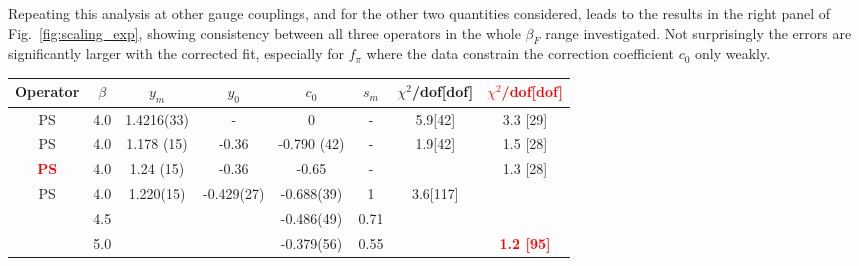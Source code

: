 \documentclass[aps,prl,twocolumn,]{revtex4}  %
\newcommand{\fig}[1]{Fig.~\ref{#1}}
\newcommand{\TODO}[1]{\textcolor{red}{{\bf #1}}}
\begin{document}
Repeating this analysis at other gauge couplings, and for the other two quantities considered, leads to the results in the right panel of \fig{fig:scaling_exp}, showing consistency between all three operators in the whole $\beta_F$ range investigated.
Not surprisingly the errors are significantly larger with the corrected fit, especially for $f_\pi$ where the data constrain the correction coefficient $c_0$ only weakly.
\begin{table}[htdp]
\begin{center}
\begin{tabular}{|c|c|c|c|c|c|c|c|}
\hline
Operator & $\beta$ & $y_m$ & $y_0$ & $c_0$ &  $ s_m $  & $\chi^2$/dof[dof] & \TODO{$\chi^2$/dof[dof] } \\
\hline\hline
PS	&	4.0	& 	1.4216(33)	&	 - 		    &	0	        &	-	    &	5.9[42]	&	3.3 [29]	\\
\hline
PS	&	4.0	&	1.178 (15)	&	-0.36	    &	-0.790 (42)	&	-	    &	1.9[42]	&	1.5 [28] \\
\hline
\TODO{PS}	&	4.0	&	1.24 (15)	&	-0.36	    &	-0.65	&	-	    &	 &	1.3 [28]	\\
\hline
PS	&	4.0	& 	1.220(15)	&	 -0.429(27) &	-0.688(39)	&	1	    &   3.6[117]	& \\
	&	4.5	&		        &			    &	-0.486(49)	&	0.71   &	& 	        \\
	&	5.0	&	        	&       		&	-0.379(56)	&	0.55	&	& \TODO{1.2 [95]}	        \\
\hline


\end{tabular}
\end{center}
\end{table}
\end{document}
